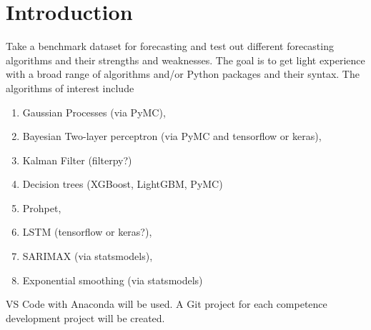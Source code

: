 \section{Introduction}
Take a benchmark dataset for forecasting and test out different forecasting algorithms and their strengths and weaknesses. The goal is to get light experience with a broad range of algorithms and/or Python packages and their syntax. The algorithms of interest include

\begin{enumerate}
	\item Gaussian Processes (via PyMC),
	\item Bayesian Two-layer perceptron (via PyMC and tensorflow or keras),
	\item Kalman Filter (filterpy?)
	\item Decision trees (XGBoost, LightGBM, PyMC)
	\item Prohpet,
	\item LSTM (tensorflow or keras?),
	\item SARIMAX (via statsmodels),
	\item Exponential smoothing (via statsmodels)
\end{enumerate}

VS Code with Anaconda will be used. A Git project for each competence development project will be created.